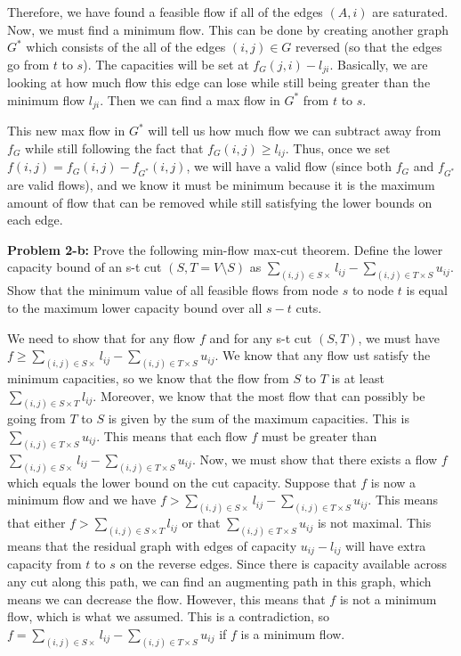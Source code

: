 \documentclass[psamsfonts]{amsart}
\newenvironment{sol}{\vspace{0.25cm}{\large \bfseries Solution:}}{\qedsymbol}
\newenvironment{prob}[1]{\begin{framed}{\large \bfseries Problem #1:}}{\end{framed}}
\begin{document}
\begin{sol}
Therefore, we have found a feasible flow if all of the edges $(A, i)$ are saturated. Now, we must find a minimum flow. This can be done by creating another graph $G^*$ which consists of the all of the edges $(i,j) \in G$ reversed (so that the edges go from $t$ to $s$). The capacities will be set at $f_{G}(j,i) - l_{ji}$. Basically, we are looking at how much flow this edge can lose while still being greater than the minimum flow $l_{ji}$. Then we can find a max flow in $G^*$ from $t$ to $s$. 

This new max flow in $G^*$ will tell us how much flow we can subtract away from $f_G$ while still following the fact that $f_G(i,j) \geq l_{ij}$. Thus, once we set $f(i,j) = f_G(i,j) - f_{G^*}(i,j)$, we will have a valid flow (since both $f_G$ and $f_{G^*}$ are valid flows), and we know it must be minimum because it is the maximum amount of flow that can be removed while still satisfying the lower bounds on each edge.
\end{sol}

\begin{prob}{2-b}
Prove the following min-flow max-cut theorem. Define the lower capacity bound of an s-t cut $(S,T = V \setminus S)$ as $\sum_{(i,j) \in S \times } l_{ij} - \sum_{(i,j) \in T \times S} u_{ij}$. Show that the minimum value of all feasible flows from node $s$ to node $t$ is equal to the maximum lower capacity bound over all $s-t$ cuts.
\end{prob}
\begin{sol}
We need to show that for any flow $f$ and for any s-t cut $(S, T)$, we must have $f \geq \sum_{(i,j) \in S \times } l_{ij} - \sum_{(i,j) \in T \times S} u_{ij}$. We know that any flow ust satisfy the minimum capacities, so we know that the flow from $S$ to $T$ is at least $\sum_{(i,j) \in S \times T} l_{ij}$. Moreover, we know that the most flow that can possibly be going from $T$ to $S$ is given by the sum of the maximum capacities. This is $\sum_{(i,j) \in T \times S} u_{ij}$. This means that each flow $f$ must be greater than $\sum_{(i,j) \in S \times } l_{ij} - \sum_{(i,j) \in T \times S} u_{ij}$. Now, we must show that there exists a flow $f$ which equals the lower bound on the cut capacity. Suppose that $f$ is now a minimum flow and we have $f > \sum_{(i,j) \in S \times } l_{ij} - \sum_{(i,j) \in T \times S} u_{ij}$. This means that either $f > \sum_{(i,j) \in S \times T} l_{ij}$ or that $\sum_{(i,j) \in T \times S} u_{ij}$ is not maximal. This means that the residual graph with edges of capacity $u_{ij} - l_{ij}$ will have extra capacity from $t$ to $s$ on the reverse edges. Since there is capacity available across any cut along this path, we can find an augmenting path in this graph, which means we can decrease the flow. However, this means that $f$ is not a minimum flow, which is what we assumed. This is a contradiction, so $f = \sum_{(i,j) \in S \times } l_{ij} - \sum_{(i,j) \in T \times S} u_{ij}$ if $f$ is a minimum flow.
\end{sol}
\end{document}
